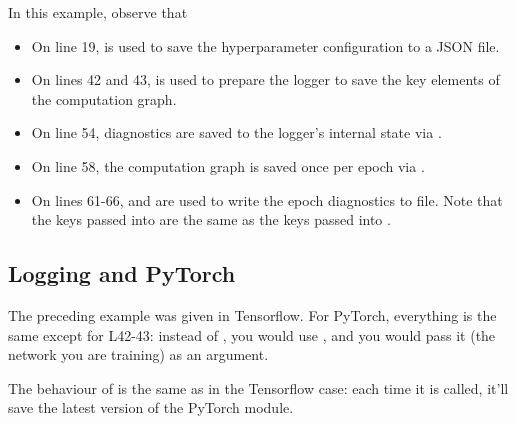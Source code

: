 \documentclass[letterpaper,10pt,english]{sphinxmanual}
\begin{document}
In this example, observe that
\begin{itemize}
\item {} 
On line 19,  is used to save the hyperparameter configuration to a JSON file.

\item {} 
On lines 42 and 43,  is used to prepare the logger to save the key elements of the computation graph.

\item {} 
On line 54, diagnostics are saved to the logger’s internal state via .

\item {} 
On line 58, the computation graph is saved once per epoch via .

\item {} 
On lines 61-66,  and  are used to write the epoch diagnostics to file. Note that the keys passed into  are the same as the keys passed into .

\end{itemize}


\subsection{Logging and PyTorch}
\label{\detokenize{utils/logger:logging-and-pytorch}}
The preceding example was given in Tensorflow. For PyTorch, everything is the same except for L42-43: instead of , you would use , and you would pass it  (the network you are training) as an argument.

The behaviour of  is the same as in the Tensorflow case: each time it is called, it’ll save the latest version of the PyTorch module.
\end{document}
